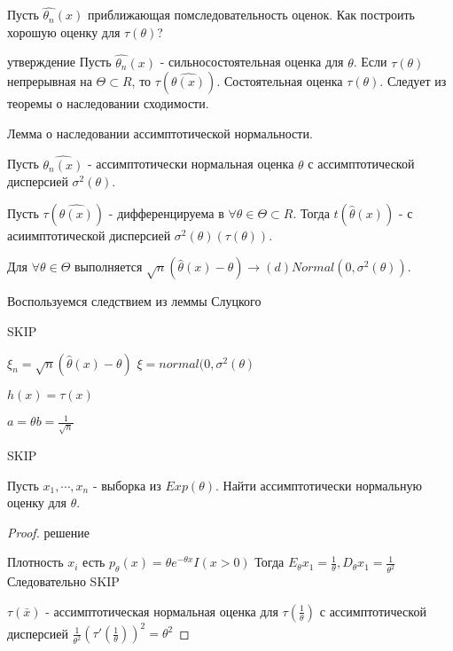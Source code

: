 Пусть $\hat{\theta_n}(x)$ приближающая помследовательность оценок. Как построить хорошую оценку для $\tau(\theta)$? 
\begin{lemma} утверждение
    Пусть $\hat{\theta_n}(x)$ - сильносостоятельная оценка для $\theta$. Если $\tau(\theta)$ непрерывная на $\Theta \subset R$, то $\tau(\hat{\theta(x)})$.
    Состоятельная оценка $\tau(\theta)$. Следует из теоремы о наследовании сходимости. 
\end{lemma}

\begin{lemma} Лемма о наследовании ассимптотической нормальности.

    Пусть $\hat{\theta_n(x)}$ - ассимптотически нормальная оценка $\theta$ с ассимптотической дисперсией $\sigma^2(\theta)$.

    Пусть $\tau(\hat{\theta(x)})$ - дифференцируема в $\forall \theta \in \Theta \subset R$.
    Тогда $t(\hat{\theta}(x))$ - с асиимптотической дисперсией $\sigma^2(\theta)(\tau(\theta))$.

    Для $\forall \theta \in \Theta$  выполняется $\sqrt{n}(\hat{\theta}(x) - \theta) \rightarrow(d) Normal(0, \sigma^2(\theta))$.
    
    Воспользуемся следствием из леммы Слуцкого

    SKIP


    $\xi_n = \sqrt{n}(\hat{\theta}(x)- \theta)$
    $\xi = normal(0, \sigma^2(\theta)$

    $h(x) = \tau(x)$

    $a = \theta b = \frac{1}{\sqrt{n}}$

     SKIP
\end{lemma}

\begin{example}
    Пусть $x_1, \cdots, x_n$ - выборка из $Exp(\theta)$. Найти ассимптотически нормальную оценку для $\theta$.
    \begin{proof} решение

        Плотность $x_i$ есть $p_{\theta}(x) = \theta e^{-\theta x} I(x > 0)$
        Тогда $E_{\theta}x_1 = \frac{1}{\theta}, D_{\theta}x_1 = \frac{1}{\theta^2}$
        Следовательно
        SKIP


        $\tau(\bar{x})$ - ассимптотическая нормальная оценка для $\tau(\frac{1}{\theta})$ с ассимптотической дисперсией 
        $\frac{1}{\theta ^2} (\tau' (\frac{1}{\theta})) ^ 2 = \theta^2$
    \end{proof}
\end{example}

